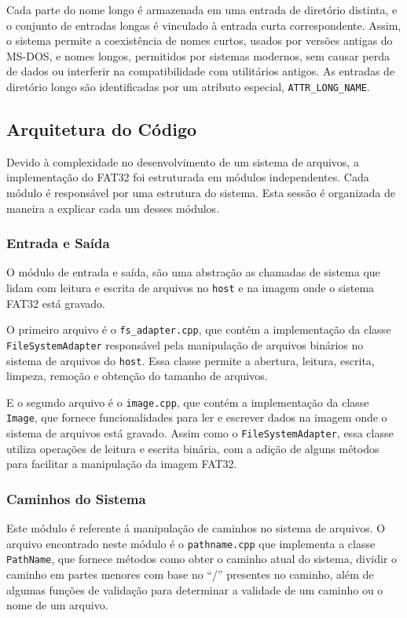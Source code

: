 \documentclass[
    12pt,				%
    oneside,   	        %
    a4paper,			%
    english,			%
    french,				%
    spanish,			%
    brazil,				%
    ]{pacotes/abntex2}
\begin{document}
Cada parte do nome longo é armazenada em uma entrada de diretório distinta, e o conjunto de entradas longas é vinculado à entrada curta correspondente. Assim, o sistema permite a coexistência de nomes curtos, usados por versões antigas do MS-DOS, e nomes longos, permitidos por sistemas modernos, sem causar perda de dados ou interferir na compatibilidade com utilitários antigos. As entradas de diretório longo são identificadas por um atributo especial, \texttt{ATTR\_LONG\_NAME}.

\subsection{Arquitetura do Código}
\label{subsec:code}

Devido à complexidade no desenvolvimento de um sistema de arquivos, a implementação do FAT32 foi estruturada em módulos independentes. Cada módulo é responsável por uma estrutura do sistema. Esta sessão é organizada de maneira a explicar cada um desses módulos.

\subsubsection{Entrada e Saída}
\label{subsubsec:io}

O módulo de entrada e saída, são uma abstração as chamadas de sistema que lidam com leitura e escrita de arquivos no \texttt{host} e na imagem onde o sistema FAT32 está gravado.

O primeiro arquivo é o \texttt{fs\_adapter.cpp}, que contém a implementação da classe \texttt{FileSystemAdapter} responsável pela manipulação de arquivos binários no sistema de arquivos do \texttt{host}. Essa classe permite a abertura, leitura, escrita, limpeza, remoção e obtenção do tamanho de arquivos.

E o segundo arquivo é o \texttt{image.cpp}, que contém a implementação da classe \texttt{Image}, que fornece funcionalidades para ler e escrever dados na imagem onde o sistema de arquivos está gravado. Assim como o \texttt{FileSystemAdapter}, essa classe utiliza operações de leitura e escrita binária, com a adição de alguns métodos para facilitar a manipulação da imagem FAT32.

\subsubsection{Caminhos do Sistema}
\label{subsubsec:parser}

Este módulo é referente á manipulação de caminhos no sistema de arquivos. O arquivo encontrado neste módulo é o \texttt{pathname.cpp} que implementa a classe \texttt{PathName}, que fornece métodos como obter o caminho atual do sistema, dividir o caminho em partes menores com base no ``/'' presentes no caminho, além de algumas funções de validação para determinar a validade de um caminho ou o nome de um arquivo.  
\end{document}
